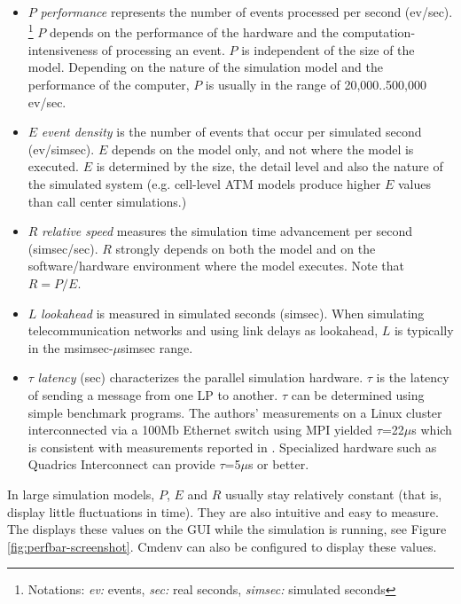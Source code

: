 \begin{itemize}
  \item{$P$ \textit{performance} represents the number of events processed per
    second (ev/sec).
       \footnote{Notations: \textit{ev:} events, \textit{sec:} real seconds,
       \textit{simsec:} simulated seconds}
    $P$ depends on the performance of the hardware and the computation-intensiveness
    of processing an event. $P$ is independent of the size of the model.
    Depending on the nature of the simulation model and the performance of the
    computer, $P$ is usually in the range of 20,000..500,000 ev/sec.}
  \item{$E$ \textit{event density} is the number of events that occur per
    simulated second (ev/simsec). $E$ depends on the model only, and not
    where the model is executed. $E$ is determined by the size, the detail level
    and also the nature of the simulated system (e.g. cell-level ATM models
    produce higher $E$ values than call center simulations.)}
  \item{$R$ \textit{relative speed} measures the simulation time advancement
    per second (simsec/sec). $R$ strongly depends on both the model and
    on the software/hardware environment where the model executes.
    Note that $R = P/E$.}
  \item{$L$ \textit{lookahead} is measured in simulated seconds (simsec).
    When simulating telecommunication networks and using link delays as
    lookahead, $L$ is typically in the msimsec-$\mu$simsec range.}
  \item{$\tau$ \textit{latency} (sec) characterizes the parallel simulation hardware.
    $\tau$ is the latency of sending a message from one LP to another. $\tau$
    can be determined using simple benchmark programs. The authors' measurements
    on a Linux cluster interconnected via a 100Mb Ethernet switch using MPI
    yielded $\tau$=22$\mu$s which is consistent with measurements reported
    in \cite{ongfarrell2000}. Specialized hardware such as
    Quadrics Interconnect \cite{quadrics} can provide $\tau$=5$\mu$s or better.}
\end{itemize}

In large simulation models, $P$, $E$ and $R$ usually stay relatively constant
(that is, display little fluctuations in time). They are also intuitive and
easy to measure. The {\opp} displays these values on the GUI while the simulation
is running, see Figure \ref{fig:perfbar-screenshot}. Cmdenv can also be configured
to display these values.

